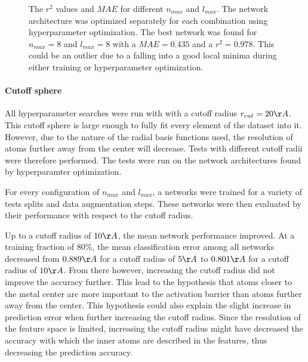 \begin{figure}[!htb]
  \endminipage
  \caption{
  The $r^2$ values and $MAE$ for different $n_{max}$ and $l_{max}$.
  The network architecture was optimized separately for each combination using hyperparameter optimization.
  The best network was found for $n_{max}=8$ and $l_{max}=8$ with a $MAE=0.435$ and a $r^2 = 0.978$.
  This could be an outlier due to a falling into a good local minima during either training or hyperparameter optimization.
  }
  \label{fig:snap_hyperparameter}
\end{figure}

\paragraph{Cutoff sphere}
All hyperparameter searches were run with with a cutoff radius $r_{cut} = 20 \AA$.
This cutoff sphere is large enough to fully fit every element of the dataset into it.
However, due to the nature of the radial basis functions used, the resolution of atoms 
further away from the center will decrease.
Tests with different cutoff radii were therefore performed.
The tests were run on the network architectures found by hyperparamter optimization.

For every configuration of $n_{max}$ and $l_{max}$, a networks were trained for a variety 
of tests splits and data augmentation steps.
These networks were then evaluated by their performance with respect to the cutoff radius.

Up to a cutoff radius of $10 \AA$, the mean network performance improved. %
At a training fraction of 80\%, the mean classification error among 
all networks decreased from $0.889 \AA$ for a cutoff radius of $5 \AA$ to 
$0.801 \AA$ for a cutoff radius of $10 \AA$.
From there however, increasing the cutoff radius did not improve the accuracy further.
This lead to the hypothesis that atoms closer to the metal center are more important to the activation barrier than atoms further away from the center.
This hypothesis could also explain the slight increase in prediction error when further increasing the cutoff radius.
Since the resolution of the feature space is limited, increasing the cutoff radius might have decreased the accuracy 
with which the inner atoms are described in the features, thus decreasing the prediction accuracy.

